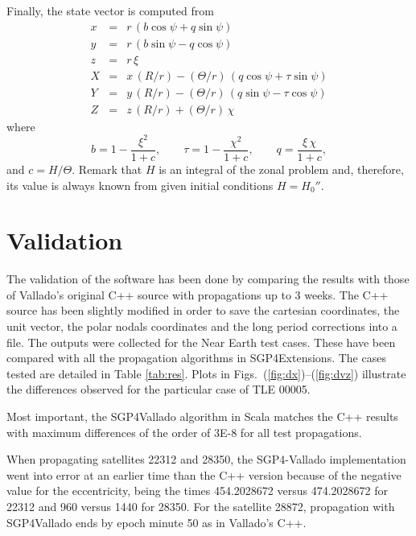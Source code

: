 \documentclass{article}
\begin{document}
Finally, the state vector is computed from
\begin{eqnarray*} \label{ns2x}
x &=& r\,(b\cos\psi+q\sin\psi) \\ \label{ns2y}
y &=& r\,(b\sin\psi-q\cos\psi) \\
z &=& r\,\xi \\
X &=& x\,(R/r) %
 - ({\Theta}/{r})\,(q\cos\psi+\tau\sin\psi) \\ \label{ns2Y}
Y &=& y\,(R/r) %
 - ({\Theta}/{r})\,(q\sin\psi-\tau\cos\psi) \\  \label{ns2zz}
Z &=& z\,(R/r)+(\Theta/r)\,\chi
\end{eqnarray*}
where
\[%
b=1-\frac{\xi^2}{1+c}, \qquad
\tau=1 - \frac{\chi^2}{1 + c}, \qquad
q=\frac{\xi\,\chi}{1+c},
\]%
and $c=H/\Theta$. Remark that $H$ is an integral of the zonal problem and, therefore, its value is always known from given initial conditions $H=H_0''$.






\section{Validation} \label{sec:validation}

The validation of the software has been done by comparing the results with those
of Vallado's original C++ source with propagations up to 3 weeks. The C++ source has been slightly modified in order
to save the cartesian coordinates, the unit vector, the polar nodals coordinates
and the long period corrections into a file. The outputs were collected
for the Near Earth test cases. These have been compared with all the propagation
algorithms in SGP4Extensions. The cases tested are detailed in Table \ref{tab:res}. Plots in Figs.~(\ref{fig:dx})--(\ref{fig:dvz}) illustrate the differences observed for the particular case of TLE 00005.

Most important, the SGP4Vallado algorithm in Scala matches the C++ results with maximum differences
of the order of 3E-8 for all test propagations.

When propagating satellites 22312 and 28350, the SGP4-Vallado implementation went into error at an earlier time
than the C++ version because of the negative value for the eccentricity, being the times 454.2028672 versus 474.2028672 for 22312 and 960 versus 1440 for 28350.
For the satellite 28872, propagation with SGP4Vallado ends by epoch minute 50 as in Vallado's C++.
\end{document}
